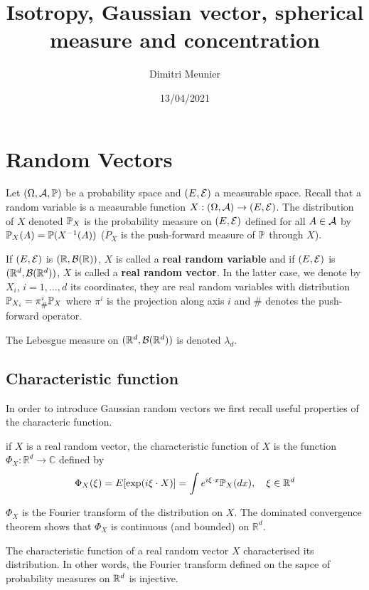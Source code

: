 \documentclass{article}
\title{Isotropy, Gaussian vector, spherical measure and concentration}
\author{Dimitri Meunier}
\date{13/04/2021}
\begin{document}
\maketitle

\section{Random Vectors}

Let $(\Omega,\cA,\P)$ be a probability space and $(E,\cE)$ a measurable space.
Recall that a random variable is a measurable function $X:(\Omega,\cA) \to
(E,\cE)$. The distribution of $X$ denoted $\P_X$ is the probability measure on
$(E,\cE)$ defined for all $A \in \cA$ by $\P_X(A) = \P(X^{-1}(A))$ ($P_X$ is the
push-forward measure of $\P$ through $X$).

If $(E,\cE)$ is $(\R,\cB(\R))$, $X$ is called a \textbf{real random
variable} and if $(E,\cE)$ is $(\Rd,\cB(\Rd))$, $X$ is called a
\textbf{real random vector}. In the latter case, we denote by $X_i$,
$i=1,\ldots,d$ its coordinates, they are real random variables with distribution
$\P_{X_i} = \pi^i_{\#}\P_X$ where $\pi^i$ is the projection along axis $i$ and
$\#$ denotes the push-forward operator.

The Lebesgue measure on $(\Rd,\cB(\Rd))$ is denoted $\lambda_d$.

\subsection{Characteristic function}

In order to introduce Gaussian random vectors we first recall useful properties
of the characteric function.

\begin{definition}
  if $X$ is a real random vector, the characteristic function of $X$ is the function
  $\Phi_{X}: \mathbb{R}^{d} \longrightarrow \mathbb{C}$ defined by 
  $$
  \Phi_{X}(\xi)=E[\exp (i \xi \cdot X)] = \int e^{i \xi \cdot x} \P_{X}(d x), \quad \xi \in \mathbb{R}^{d}
  $$

  $\Phi_{X}$ is the Fourier transform of the distribution on $X$. The dominated
  convergence theorem shows that $\Phi_{X}$ is continuous (and bounded) on $\mathbb{R}^{d}$.
\end{definition}

\begin{theorem}
  The characteristic function of a real random vector $X$ characterised its
  distribution. In other words, the Fourier transform defined on the sapce of
  probability measures on $\Rd$ is injective. 
\end{theorem}
\end{document}
